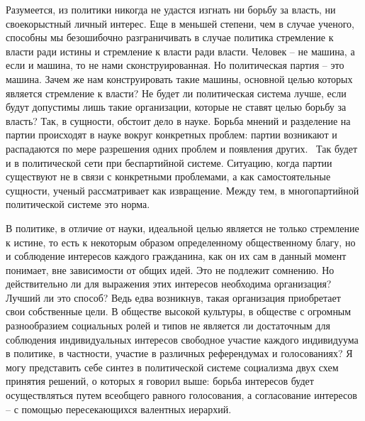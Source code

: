 \documentclass{book}
\begin{document}
Разумеется, из политики никогда не удастся изгнать ни борь­бу за власть, ни своекорыстный личный интерес. Еще в мень­шей степени, чем в случае ученого, способны мы безошибочно разграничивать в случае политика стремление к власти ради истины и стремление к власти ради власти. Человек -- не маши­на, а если и машина, то не нами сконструированная. Но поли­тическая партия -- это машина. Зачем же нам конструировать такие машины, основной целью которых является стремление к власти? Не будет ли политическая система лучше, если будут допустимы лишь такие организации, которые не ставят целью борьбу за власть? Так, в сущности, обстоит дело в науке. Борь­ба мнений и разделение на партии происходят в науке вокруг конкретных проблем: партии возникают и распадаются по мере разрешения одних проблем и появления других.  Так будет и в политической сети при беспартийной системе. Ситуацию, ког­да партии существуют не в связи с конкретными проблемами, а как самостоятельные сущности, ученый рассматривает как извращение. Между тем,
 в многопартийной политической си­стеме это норма.

В политике, в отличие от науки, идеальной целью является не только стремление к истине, то есть к некоторым образом определенному общественному благу, но и соблюдение инте­ресов каждого гражданина, как он их сам в данный момент понимает, вне зависимости от общих идей. Это не подлежит сомнению. Но действительно ли для выражения этих интересов необходима организация? Лучший ли это способ? Ведь едва возникнув, такая организация приобретает свои собственные цели. В обществе высокой культуры, в обществе с огромным разнообразием социальных ролей и типов не является ли доста­точным для соблюдения индивидуальных интересов свободное участие каждого индивидуума в политике, в частности, участие в различных референдумах и голосованиях? Я могу предста­вить себе синтез в политической системе социализма двух схем принятия решений, о которых я говорил выше: борьба интере­сов будет осуществляться путем всеобщего равного голосова­ния, а согласование интересов -- с помощью пересекающихся валентных иерархий.
\end{document}

